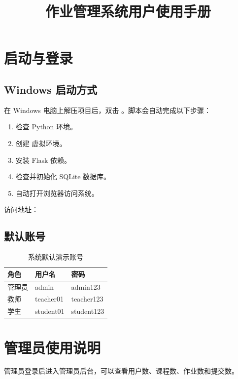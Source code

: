\documentclass[UTF8,12pt]{ctexart}
\title{\textbf{作业管理系统用户使用手册}}
\author{}
\date{}
\begin{document}
\maketitle

\section{启动与登录}

\subsection{Windows 启动方式}

在 Windows 电脑上解压项目后，双击 。脚本会自动完成以下步骤：

\begin{enumerate}
  \item 检查 Python 环境。
  \item 创建  虚拟环境。
  \item 安装 Flask 依赖。
  \item 检查并初始化 SQLite 数据库。
  \item 自动打开浏览器访问系统。
\end{enumerate}

访问地址：

\subsection{默认账号}

\begin{table}[H]
\centering
\begin{tabular}{lll}
\toprule
角色 & 用户名 & 密码 \\
\midrule
管理员 & admin & admin123 \\
教师 & teacher01 & teacher123 \\
学生 & student01 & student123 \\
\bottomrule
\end{tabular}
\caption{系统默认演示账号}
\end{table}


\newpage

\section{管理员使用说明}

管理员登录后进入管理员后台，可以查看用户数、课程数、作业数和提交数。
\end{document}
